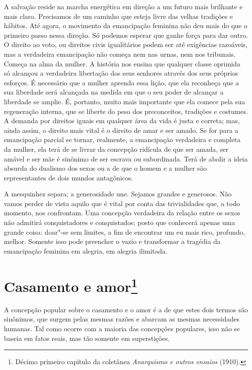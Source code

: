 A salvação reside na marcha energética em direção a um futuro mais
brilhante e mais claro. Precisamos de um caminho que esteja livre das
velhas tradições e hábitos. Até agora, o movimento da emancipação
feminina não deu mais do que o primeiro passo nessa direção. Só podemos
esperar que ganhe força para dar outro. O direito ao voto, ou direitos
civis igualitários podem ser até exigências razoáveis, mas a verdadeira
emancipação não começa nem nas urnas, nem nos tribunais. Começa na alma
da mulher. A história nos ensina que qualquer classe oprimida só
alcançou a verdadeira libertação dos seus senhores através dos seus
próprios esforços. É necessário que a mulher aprenda essa lição, que ela
reconheça que a sua liberdade será alcançada na medida em que o seu
poder de alcançar a liberdade se amplie. É, portanto, muito mais
importante que ela comece pela sua regeneração interna, que se liberte
do peso dos preconceitos, tradições e costumes. A demanda por direitos
iguais em qualquer área da vida é justa e correta; mas, ainda assim, o
direito mais vital é o direito de amar e ser amado. Se for para a
emancipação parcial se tornar, realmente, a emancipação verdadeira e
completa da mulher, ela terá de se livrar da concepção ridícula de que
ser amada, ser amável e ser mãe é sinônimo de ser escrava ou
subordinada. Terá de abolir a ideia absurda do dualismo dos sexos ou a
de que o homem e a mulher são representantes de dois mundos antagônicos.

A mesquinhez separa; a generosidade une. Sejamos grandes e generosos.
Não vamos perder de vista aquilo que é vital por conta das trivialidades
que, a todo momento, nos confrontam. Uma concepção verdadeira da relação
entre os sexos não admitirá conquistadores e conquistados; posto que
conhecerá apenas uma grande coisa: doar"-se sem limites, a fim de
encontrar um eu mais rico, profundo, melhor. Somente isso pode preencher
o vazio e transformar a tragédia da emancipação feminina em alegria, em
alegria ilimitada.

\chapter{Casamento e amor\footnote[*]{Décimo primeiro capítulo da coletânea
  \emph{Anarquismo e outros ensaios} (1910).}}

A concepção popular sobre o casamento e o amor é a de que estes dois
termos são sinônimos, que surgem pelas mesmas razões e abarcam as mesmas
necessidades humanas. Tal como ocorre com a maioria das concepções
populares, isso não se baseia em fatos reais, mas tão somente em
superstições.

